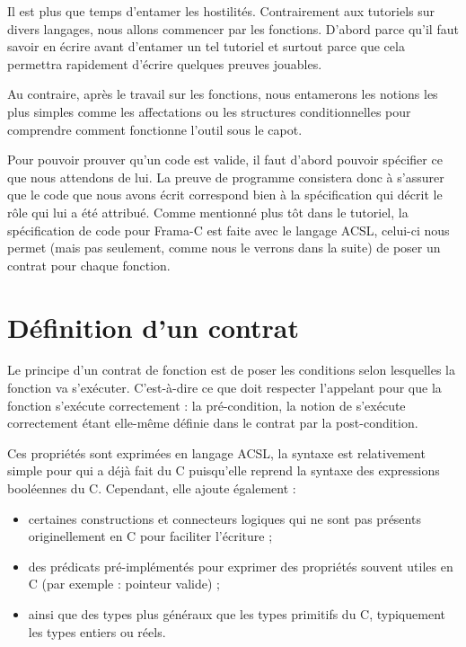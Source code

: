 \documentclass[12pt,francais,]{scrbook}
\providecommand{\tightlist}{%
  \setlength{\itemsep}{0pt}\setlength{\parskip}{0pt}}
\begin{document}
Il est plus que temps d'entamer les hostilités. Contrairement aux
tutoriels sur divers langages, nous allons commencer par les fonctions.
D'abord parce qu'il faut savoir en écrire avant d'entamer un tel
tutoriel et surtout parce que cela permettra rapidement d'écrire
quelques preuves jouables.

Au contraire, après le travail sur les fonctions, nous entamerons les
notions les plus simples comme les affectations ou les structures
conditionnelles pour comprendre comment fonctionne l'outil sous le
capot.

Pour pouvoir prouver qu'un code est valide, il faut d'abord pouvoir
spécifier ce que nous attendons de lui. La preuve de programme
consistera donc à s'assurer que le code que nous avons écrit correspond
bien à la spécification qui décrit le rôle qui lui a été attribué. Comme
mentionné plus tôt dans le tutoriel, la spécification de code pour
Frama-C est faite avec le langage ACSL, celui-ci nous permet (mais pas
seulement, comme nous le verrons dans la suite) de poser un contrat pour
chaque fonction.

\section{Définition d'un contrat}\label{duxe9finition-dun-contrat}

Le principe d'un contrat de fonction est de poser les conditions selon
lesquelles la fonction va s'exécuter. C'est-à-dire ce que doit respecter
l'appelant pour que la fonction s'exécute correctement : la
pré-condition, la notion de \og{}s'exécute correctement\fg{} étant elle-même
définie dans le contrat par la post-condition.

Ces propriétés sont exprimées en langage ACSL, la syntaxe est
relativement simple pour qui a déjà fait du C puisqu'elle reprend la
syntaxe des expressions booléennes du C. Cependant, elle ajoute
également :

\begin{itemize}
\tightlist
\item
  certaines constructions et connecteurs logiques qui ne sont pas
  présents originellement en C pour faciliter l'écriture ;
\item
  des prédicats pré-implémentés pour exprimer des propriétés souvent
  utiles en C (par exemple : pointeur valide) ;
\item
  ainsi que des types plus généraux que les types primitifs du C,
  typiquement les types entiers ou réels.
\end{itemize}
\end{document}
